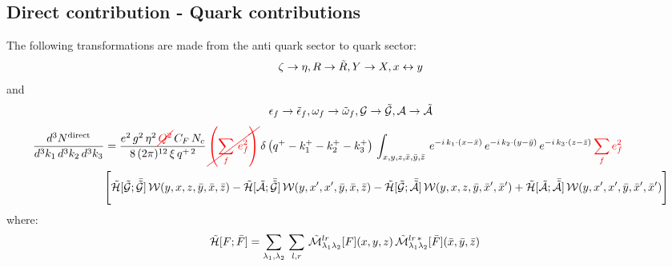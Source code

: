 \documentclass[9pt]{article}
\newcommand{\chg}[1]{{\color{red}#1}}
\newcommand{\del}[1]{{\color{red}\cancel{#1}}}
\numberwithin{equation}{section}
\begin{document}
\subsection{Direct contribution - Quark contributions}
The following transformations are made from the anti quark sector to quark sector: \
$$\zeta\rightarrow \eta, R\rightarrow \Tilde{R}, Y \rightarrow X, x\leftrightarrow y$$
and 
$$\epsilon_{f}\rightarrow \Tilde{\epsilon}_{f}, \omega_{f}\rightarrow \Tilde{\omega}_{f}, \mathcal{G} \rightarrow \mathcal{\Tilde{G}}, \mathcal{A} \rightarrow \mathcal{\Tilde{A}}$$
\begin{align}
     \frac{d^{3}N^{\text{direct}}}{d^{3}k_{1}\,d^{3}k_{2}\, d^{3}k_{3}} & = \frac{e^{2}\,g^{2}\,\eta^{2}\,\del{Q^{2}}\,C_{F}\,N_{c}}{8\, (2\pi)^{12}\,\xi\,q^{+\,2}}\, \del{\left(\sum_{f}\, e^{2}_{f}\right)}\, \delta\left(q^{+}-k^{+}_{1}-k^{+}_{2}-k^{+}_{3}\right)\, \int_{x,y,z,\Bar{x},\Bar{y},\Bar{z}}\, e^{-i\,k_{1}\cdot (x-\Bar{x})}\, e^{-i\,k_{2}\cdot (y-\Bar{y})}\, e^{-i\,k_{3}\cdot (z-\Bar{z})}\,\chg{\sum_{f}e^{2}_{f}}\notag \\ & \Bigg[\mathcal{\Tilde{H}}[\mathcal{\Tilde{G}};\mathcal{\Bar{\Tilde{G}}}]\,\mathcal{W}(y,x,z,\Bar{y},\Bar{x},\Bar{z}) - \mathcal{\Tilde{H}}[\mathcal{\Tilde{A}};\mathcal{\Bar{\Tilde{G}}}]\,\mathcal{W}(y,x',x',\Bar{y},\Bar{x},\Bar{z})-\mathcal{\Tilde{H}}[\mathcal{\Tilde{G}};\mathcal{\Bar{\Tilde{A}}}]\,\mathcal{W}(y,x,z,\Bar{y},\Bar{x}',\Bar{x}')+ \mathcal{\Tilde{H}}[\mathcal{\Tilde{A}};\mathcal{\Bar{\Tilde{A}}}]\,\mathcal{W}(y,x',x',\Bar{y},\Bar{x}',\Bar{x}')\Bigg]
\label{chg:Q2q}\end{align}
where:
\begin{align}
    \mathcal{\Tilde{H}}[F;\Bar{F}] & = \sum_{\lambda_{1},\lambda_{2}}\, \sum_{l,r}\, \mathcal{\Tilde{M}}^{lr}_{\lambda_{1}\lambda_{2}}[F](x,y,z)\, \mathcal{\Tilde{M}}^{lr\,*}_{\lambda_{1}\lambda_{2}}[\Bar{F}](\Bar{x},\Bar{y},\Bar{z})
\end{align}
\end{document}
